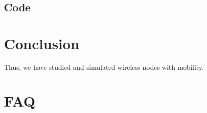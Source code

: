 \documentclass[11pt]{article}
\begin{document}
\subsection{Code}



\section{Conclusion}
Thus, we have studied and simulated wireless nodes with mobility.

\clearpage

\section{FAQ}
\end{document}

